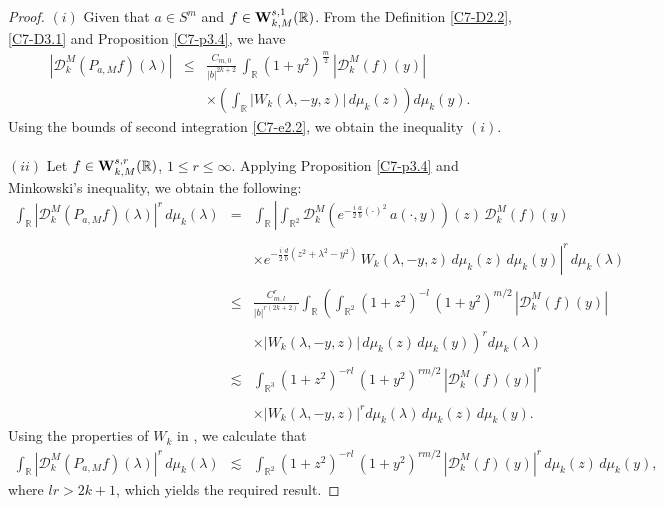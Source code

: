 \documentclass[12pt,a4paper,reqno]{amsproc}
\theoremstyle{definition}
\theoremstyle{remark}
\numberwithin{equation}{section}
\begin{document}
\begin{proof}
$(i)$ Given that $a\in S^m$ and $f\in  {\bf{W}}_{k,M}^{s,1}(\mathbb{R})$. From the Definition \ref{C7-D2.2}, \ref{C7-D3.1} and  Proposition \ref{C7-p3.4}, we have
\begin{eqnarray*}
    |\mathcal{D}_k^M(P_{a,M}f)(\lambda)| &\le& \frac{C_{m,0}}{|b|^{2k+2}}\,\int_{\mathbb{R}}(1+y^2)^{\frac{m}{2}}\, |\mathcal{D}_k^M(f)(y)|\\
    && \times \left(\int_{\mathbb{R}}|W_k(\lambda,-y,z)|\,d\mu_k(z) \right) d\mu_k(y).
\end{eqnarray*}
Using the bounds of second integration \eqref{C7-e2.2}, we obtain the inequality $(i)$.\\\\
$(ii)$ Let  $f\in {\bf{W}}_{k,M}^{s,r}(\mathbb{R})$, $1\le r \le \infty$. Applying Proposition \ref{C7-p3.4} and Minkowski's inequality, we obtain the following:
\begin{eqnarray*}
\int_{\mathbb{R}} |\mathcal{D}_k^M(P_{a,M}f)(\lambda)|^r\,d\mu_k(\lambda) &=& \int_{\mathbb{R}} \left|\int_{\mathbb{R}^2} \mathcal{D}_k^M\left(e^{-\frac{i}{2}\frac{a}{b}(\cdot)^2}\,a(\cdot,y)\right)(z)\,\mathcal{D}_k^M(f)(y) \right.\\\\
&&\times \left. e^{-\frac{i}{2}\frac{d}{b}(z^2+\lambda^2-y^2)}\,W_k(\lambda,-y,z)\,d\mu_k(z)\,d\mu_k(y)\right|^r\,d\mu_k(\lambda)\\\\
 &\le& \frac{C_{m,l}^r}{|b|^{r(2k+2)}} \int_{\mathbb{R}} \left( \int_{\mathbb{R}^2} (1+z^2)^{-l}\,(1+y^2)^{m/2}\,|\mathcal{D}_k^M(f)(y)| \right.\\\\
 &&\left. \times|W_k(\lambda,-y,z)|\,d\mu_k(z)\,d\mu_k(y) \right)^r d\mu_k(\lambda)\\\\
 &\lesssim&  \int_{\mathbb{R}^3}(1+z^2)^{-rl}\,(1+y^2)^{rm/2}\,|\mathcal{D}_k^M(f)(y)|^r\\\\
 && \times|W_k(\lambda,-y,z)|^rd\mu_k(\lambda)\,d\mu_k(z)\,d\mu_k(y).
 \end{eqnarray*}
 Using the properties of $W_k$ in \cite{soltani2004lp}, we calculate that
 \begin{eqnarray*}
\int_{\mathbb{R}} |\mathcal{D}_k^M(P_{a,M}f)(\lambda)|^r\,d\mu_k(\lambda)&\lesssim& \int_{\mathbb{R}^2}(1+z^2)^{-rl}\,(1+y^2)^{rm/2}\,|\mathcal{D}_k^M(f)(y)|^r\,d\mu_k(z)\,d\mu_k(y), 
 \end{eqnarray*}
 where $lr>2k+1$, which yields the required result.
\end{proof}
\end{document}

